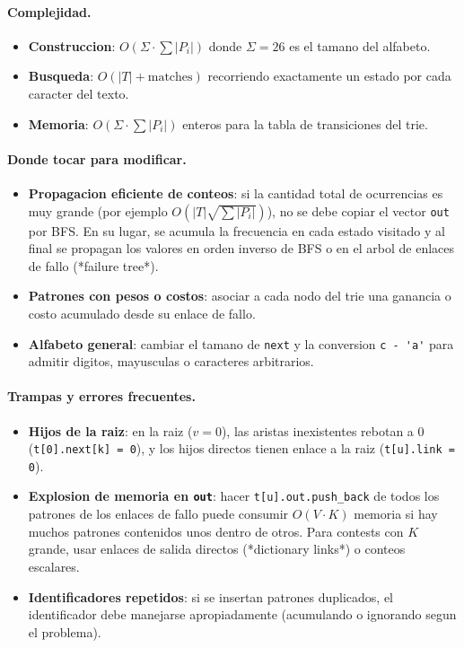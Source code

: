 \paragraph{Complejidad.}
\begin{itemize}\setlength\itemsep{0pt}
	\item \textbf{Construccion}: $O(\Sigma \cdot \sum |P_i|)$ donde $\Sigma = 26$ es el tamano del alfabeto.
	\item \textbf{Busqueda}: $O(|T| + \text{matches})$ recorriendo exactamente un estado por cada caracter del texto.
	\item \textbf{Memoria}: $O(\Sigma \cdot \sum |P_i|)$ enteros para la tabla de transiciones del trie.
\end{itemize}

\paragraph{Donde tocar para modificar.}
\begin{itemize}\setlength\itemsep{0pt}
	\item \textbf{Propagacion eficiente de conteos}: si la cantidad total de ocurrencias es muy grande (por ejemplo $O(|T| \sqrt{\sum |P_i|})$), no se debe copiar el vector \verb|out| por BFS. En su lugar, se acumula la frecuencia en cada estado visitado y al final se propagan los valores en orden inverso de BFS o en el arbol de enlaces de fallo (*failure tree*).
	\item \textbf{Patrones con pesos o costos}: asociar a cada nodo del trie una ganancia o costo acumulado desde su enlace de fallo.
	\item \textbf{Alfabeto general}: cambiar el tamano de \verb|next| y la conversion \verb|c - 'a'| para admitir digitos, mayusculas o caracteres arbitrarios.
\end{itemize}

\paragraph{Trampas y errores frecuentes.}
\begin{itemize}\setlength\itemsep{0pt}
	\item \textbf{Hijos de la raiz}: en la raiz ($v = 0$), las aristas inexistentes rebotan a 0 (\verb|t[0].next[k] = 0|), y los hijos directos tienen enlace a la raiz (\verb|t[u].link = 0|).
	\item \textbf{Explosion de memoria en \texttt{out}}: hacer \verb|t[u].out.push_back| de todos los patrones de los enlaces de fallo puede consumir $O(V \cdot K)$ memoria si hay muchos patrones contenidos unos dentro de otros. Para contests con $K$ grande, usar enlaces de salida directos (*dictionary links*) o conteos escalares.
	\item \textbf{Identificadores repetidos}: si se insertan patrones duplicados, el identificador debe manejarse apropiadamente (acumulando o ignorando segun el problema).
\end{itemize}

